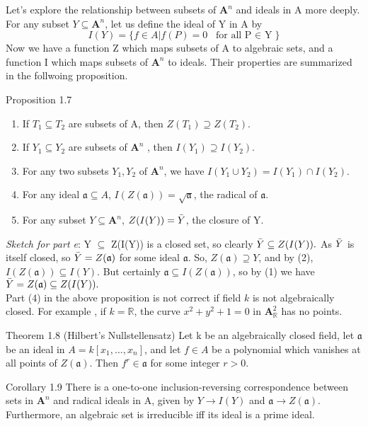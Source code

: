 \documentclass[12pt]{article}
\begin{document}
Let's explore the relationship between subsets of $\mathbf{A}^n$ and ideals in A more deeply. For any subset $Y \subseteq \mathbf{A}^n$, let us define the ideal of Y in A by $$I(Y) = \{f \in A | f(P) = 0\;\; \text{for all P $\in$ Y}\}$$Now we have a function Z which maps subsets of A to algebraic sets, and a function I which maps subsets of $\mathbf{A}^n$ to ideals. Their properties are summarized in the follwoing proposition.
\begin{propositionBox}{Proposition 1.7}
\begin{enumerate}
    \item If $T_{1} \subseteq T_{2}$ are subsets of A, then $Z(T_{1}) \supseteq Z(T_{2}).$
    \item If $Y_{1} \subseteq Y_{2}$ are subsets of $\mathbf{A}^n$ , then $I(Y_{1}) \supseteq I(Y_{2}).$
    \item For any two subsets $Y_{1}, Y_{2}$ of $\mathbf{A}^n$, we have $I(Y_{1} \cup Y_{2}) = I(Y_{1}) \cap I(Y_{2}).$
    \item For any ideal $\mathfrak{a} \subseteq A$, $I(Z(\mathfrak{a})) = \sqrt{\mathfrak{a}}$, the radical of $\mathfrak{a}$.
    \item For any subset $Y \subseteq \mathbf{A}^n$, $Z(I(Y)) = \Bar{Y}$, the closure of Y.
\end{enumerate}
\end{propositionBox}
\textit{Sketch for part e}: Y $\subseteq$ Z(I(Y)) is a closed set, so clearly $\Bar{Y} \subseteq Z(I(Y)).$ As $\Bar{Y}$ is itself closed, so  $\Bar{Y} = Z(\mathfrak{a})$ for some ideal $\mathfrak{a}$. So, $Z(\mathfrak{a}) \supseteq Y$, and by (2), $I(Z(\mathfrak{a})) \subseteq I(Y).$ But certainly $\mathfrak{a} \subseteq I(Z(\mathfrak{a}))$, so by (1) we have $\Bar{Y} = Z(\mathfrak{a}) \subseteq Z(I(Y)).$\\
\noindent Part (4) in the above proposition is not correct if field $k$ is not algebraically closed. For example , if $k = \mathbb{R}$, the curve $x^2 + y^2 + 1 = 0$ in $\mathbf{A}^2_{\mathbb{R}}$ has no points. 
\begin{theoremBox}{Theorem 1.8}
  (Hilbert's Nullstellensatz)  Let k be an algebraically closed field, let $\mathfrak{a}$ be an ideal in $A = k[x_{1},...,x_{n}]$, and let $f \in A$ be a polynomial which vanishes at all points of $Z(\mathfrak{a})$. Then $f^{r} \in \mathfrak{a}$ for some integer $r > 0$.
\end{theoremBox}
\begin{corollaryBox}{Corollary 1.9}
    There is a one-to-one inclusion-reversing correspondence between sets in $\mathbf{A}^n$ and radical ideals in A, given by $Y \rightarrow I(Y)$ and $\mathfrak{a} \rightarrow Z(\mathfrak{a})$. Furthermore, an algebraic set is irreducible iff its ideal is a prime ideal.
\end{corollaryBox}\noindent
\end{document}
